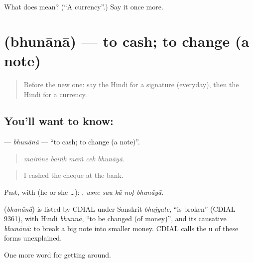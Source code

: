 \begin{tcolorbox}[breakable,colback=teal!4,colframe=teal!35!black,title={Before you move on}]
What does  mean? (\textquotedblleft{}A currency\textquotedblright{}.) Say it once more.
\end{tcolorbox}
\section[\texorpdfstring{\hi{भुनाना} (bhunānā)}{भुनाना (bhunānā)}]{ (bhunānā) — to cash; to change (a note)}

\label{lesson:HI-C429-bhunana}



\begin{quote}
Before the new one: say the Hindi for a signature (everyday), then the Hindi for a currency.
\end{quote}

\subsection*{You'll want to know: }
\textbf{} — \emph{bhunānā} — \textquotedblleft{}to cash; to change (a note)\textquotedblright{}.

\begin{quote}
    
\end{quote}

\begin{quote}
\emph{maiṁne baiṅk meṁ cek bhunāyā.}
\end{quote}

\begin{quote}
I cashed the cheque at the bank.
\end{quote}

Past, with  (he or she …):     , \emph{usne sau kā noṭ bhunāyā}.

\begin{cousinweb}
\textbf{} (\emph{bhunānā}) is listed by CDIAL under Sanskrit \emph{bhajyate}, \textquotedblleft{}is broken\textquotedblright{} (CDIAL 9361), with Hindi \emph{bhunnā}, \textquotedblleft{}to be changed (of money)\textquotedblright{}, and its causative \emph{bhunānā}: to break a big note into smaller money. CDIAL calls the u of these forms unexplained.
\end{cousinweb}

\begin{grammarlens}[title={What you've built}]
One more word for getting around.
\end{grammarlens}

